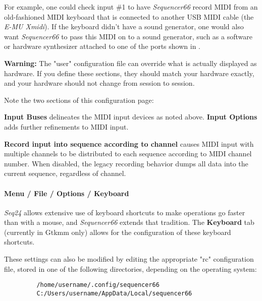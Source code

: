    For example, one could check input \#1 to have \textsl{Sequencer66} record
   MIDI from an old-fashioned MIDI keyboard that is connected to another
   USB MIDI cable (the \textsl{E-MU Xmidi}).  If the keyboard didn't have a
   sound generator, one would also want \textsl{Sequencer66} to pass this MIDI
   on to a sound generator, such as a software or hardware synthesizer attached
   to one of the ports shown in
   .

   \textbf{Warning:}
   The "user" configuration file can override what is actually
   displayed as hardware.  If you define these sections, they should match your
   hardware exactly, and your hardware should not change from session to
   session.

   Note the two sections of this configuration page:

   \textbf{Input Buses} delineates the MIDI input devices as noted above.
   \textbf{Input Options} adds further refinements to MIDI input.

   \textbf{Record input into sequence according to channel}
   causes MIDI input with multiple channels to be distributed to
   each sequence according to MIDI channel number.
   When disabled, the legacy recording behavior dumps all data into the current
   sequence, regardless of channel.


\paragraph{Menu / File / Options / Keyboard }
\label{paragraph:seq66_menu_file_options_keyboard}

   \textsl{Seq24} allows extensive use of
   keyboard shortcuts to make operations go faster than with a mouse,
   and \textsl{Sequencer66} extends that tradition.
   The \textbf{Keyboard} tab (currently in Gtkmm only)
   allows for the configuration of these keyboard shortcuts.

   These settings can also be modified by editing the appropriate "rc"
   configuration file, stored in one of the following directories, depending on
   the operating system:
   
   \begin{verbatim}
         /home/username/.config/sequencer66
         C:/Users/username/AppData/Local/sequencer66
   \end{verbatim}

